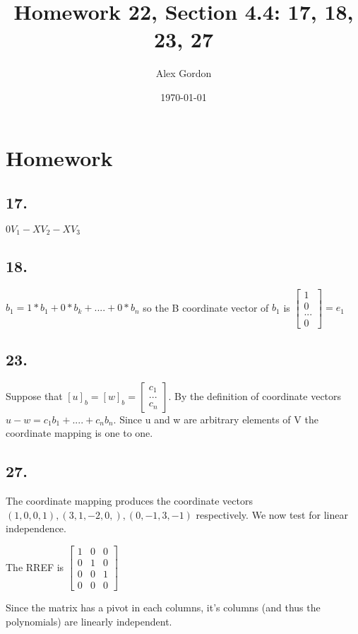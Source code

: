\documentclass[12]{scrartcl}
\begin{document}
\title{Homework 22, Section 4.4: 17, 18, 23, 27}
\author{Alex Gordon}
\date{\today}
\maketitle
\section*{Homework}
\subsection*{17.}
$0V_1 - XV_2 - XV_3$
\subsection*{18.}
$b_1 = 1 * b_1 + 0 * b_k + .... + 0 * b_n $ so the B coordinate vector of $b_1$ is $ \begin{bmatrix}  1 \\ 0 \\ ... \\ 0  \end{bmatrix} = e_1$
\subsection*{23.}
Suppose that $[u]_b = [w]_b = \begin{bmatrix}  c_1 \\ ... \\ c_n  \end{bmatrix}$. By the definition of coordinate vectors $u - w = c_1b_1 + .... + c_n b_n$. Since u and w are arbitrary elements of V the coordinate mapping is one to one. 
\subsection*{27.}
The coordinate mapping produces the coordinate vectors $(1, 0, 0, 1), (3, 1, -2, 0,), (0, -1, 3, -1) $ respectively. We now test for linear independence. 

The RREF is $\begin{bmatrix} 1 & 0 & 0 \\ 0 & 1 & 0 \\ 0 & 0 & 1 \\ 0 & 0 & 0 \end{bmatrix}$ 

Since the matrix has a pivot in each columns, it's columns (and thus the polynomials) are linearly independent. 
 
\end{document}
